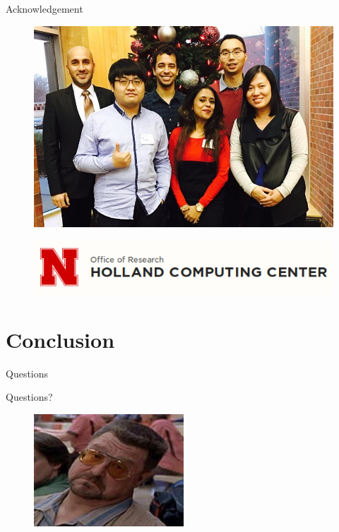 \documentclass{beamer}
\begin{document}
  \begin{frame}{Acknowledgement}
	\begin{figure}[ht]
	  \centering
	  \includegraphics[height=0.6\textheight,keepaspectratio]{figures/sbbi.jpg}
	  \caption*{\label{fig:sbbi}}
	\end{figure}
	\vspace{-1cm}
	\begin{figure}[ht]
	  \centering
	  \includegraphics[height=0.2\textheight,keepaspectratio]{figures/hcc.png}
	  \caption*{\label{fig:hcc}}
	\end{figure}

	\end{frame}

\section{Conclusion}
\begin{frame}{Questions}
	\begin{center}
		\Huge{Questions?}
	\end{center}
	\begin{figure}
		\centering
		\includegraphics[width=0.5\textwidth, height=1.0\textheight, keepaspectratio]{figures/walter.jpg}
	\end{figure}
\end{frame}
\end{document}
